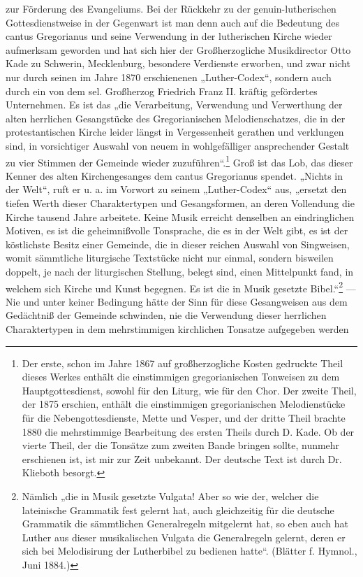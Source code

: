 zur Förderung des Evangeliums. Bei der Rückkehr zu der genuin-lutherischen Gottesdienstweise in der Gegenwart ist man denn auch auf die Bedeutung des cantus Gregorianus und seine Verwendung in der lutherischen Kirche wieder aufmerksam geworden und hat sich hier der Großherzogliche Musikdirector Otto Kade zu Schwerin, Mecklenburg, besondere Verdienste erworben, und zwar nicht nur durch seinen im Jahre 1870 erschienenen „Luther-Codex“, sondern auch durch ein von dem sel. Großherzog Friedrich Franz II. kräftig gefördertes Unternehmen. Es ist das „die Verarbeitung, Verwendung und Verwerthung der alten herrlichen Gesangstücke des Gregorianischen Melodienschatzes, die in der protestantischen Kirche leider längst in Vergessenheit gerathen und verklungen sind, in vorsichtiger Auswahl von neuem in wohlgefälliger ansprechender Gestalt zu vier Stimmen der Gemeinde wieder zuzuführen“.\footnote{Der erste, schon im Jahre 1867 auf großherzogliche Kosten gedruckte Theil dieses Werkes enthält die einstimmigen gregorianischen Tonweisen zu dem Hauptgottesdienst, sowohl für den Liturg, wie für den Chor. Der zweite Theil, der 1875 erschien, enthält die einstimmigen gregorianischen Melodienstücke für die Nebengottesdienste, Mette und Vesper, und der dritte Theil brachte 1880 die mehrstimmige Bearbeitung des ersten Theils durch D. Kade. Ob der vierte Theil, der die Tonsätze zum zweiten Bande bringen sollte, nunmehr erschienen ist, ist mir zur Zeit unbekannt. Der deutsche Text ist durch Dr. Klieboth besorgt.} Groß ist das Lob, das dieser Kenner des alten Kirchengesanges dem cantus Gregorianus spendet. „Nichts in der Welt“, ruft er u. a. im Vorwort zu seinem „Luther-Codex“ aus, „ersetzt den tiefen Werth dieser Charaktertypen und Gesangsformen, an deren Vollendung die Kirche tausend Jahre arbeitete. Keine Musik erreicht denselben an eindringlichen Motiven, es ist die geheimnißvolle Tonsprache, die es in der Welt gibt, es ist der köstlichste Besitz einer Gemeinde, die in dieser reichen Auswahl von Singweisen, womit sämmtliche liturgische Textstücke nicht nur einmal, sondern bisweilen doppelt, je nach der liturgischen Stellung, belegt sind, einen Mittelpunkt fand, in welchem sich Kirche und Kunst begegnen. Es ist die in Musik gesetzte Bibel.“\footnote{Nämlich „die in Musik gesetzte Vulgata! Aber so wie der, welcher die lateinische Grammatik fest gelernt hat, auch gleichzeitig für die deutsche Grammatik die sämmtlichen Generalregeln mitgelernt hat, so eben auch hat Luther aus dieser musikalischen Vulgata die Generalregeln gelernt, deren er sich bei Melodisirung der Lutherbibel zu bedienen hatte“. (Blätter f. Hymnol., Juni 1884.)} — Nie und unter keiner Bedingung hätte der Sinn für diese Gesangweisen aus dem Gedächtniß der Gemeinde schwinden, nie die Verwendung dieser herrlichen Charaktertypen in dem mehrstimmigen kirchlichen Tonsatze aufgegeben werden
